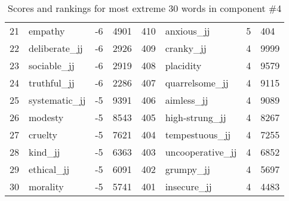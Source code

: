 \begin{table}[tbp]
\begin{tabular}{| rlr@{.}l | rlr@{.}l |}
    21 & empathy & -6 & 4901    &    410 & anxious\_jj & 5 & 404 \\
    22 & deliberate\_jj & -6 & 2926    &    409 & cranky\_jj & 4 & 9999 \\
    23 & sociable\_jj & -6 & 2919    &    408 & placidity & 4 & 9579 \\
    24 & truthful\_jj & -6 & 2286    &    407 & quarrelsome\_jj & 4 & 9115 \\
    25 & systematic\_jj & -5 & 9391    &    406 & aimless\_jj & 4 & 9089 \\
    26 & modesty & -5 & 8543    &    405 & high-strung\_jj & 4 & 8267 \\
    27 & cruelty & -5 & 7621    &    404 & tempestuous\_jj & 4 & 7255 \\
    28 & kind\_jj & -5 & 6363    &    403 & uncooperative\_jj & 4 & 6852 \\
    29 & ethical\_jj & -5 & 6091    &    402 & grumpy\_jj & 4 & 5697 \\
    30 & morality & -5 & 5741    &    401 & insecure\_jj & 4 & 4483 \\
    \hline
    \end{tabular}
    \caption{Scores and rankings for most extreme 30 words in component \#4} 
\end{table}
\clearpage
